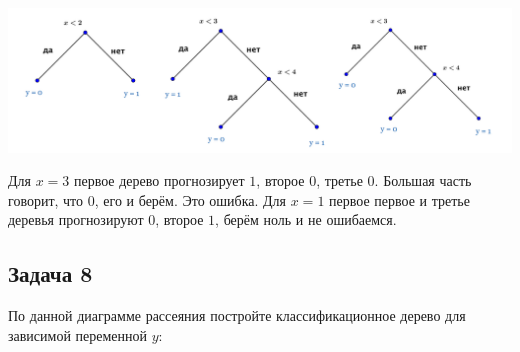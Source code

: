 \documentclass[12pt, a4paper, oneside]{article}
\theoremstyle{plain} %
\theoremstyle{definition}
\begin{document}
{\begin{enumerate}
		
		\begin{center}
			\includegraphics[scale=0.17]{forest.png}
		\end{center} 	
		
		Для $x=3$ первое дерево прогнозирует $1$, второе $0$, третье $0$. Большая часть говорит, что $0$, его и берём. Это ошибка. Для $x=1$ первое первое и третье деревья прогнозируют $0$, второе $1$, берём ноль и не ошибаемся. 
	\end{enumerate}
	
}


\subsection*{Задача 8}

По данной диаграмме рассеяния постройте классификационное дерево для зависимой переменной $y$:

\begin{center}
	\begin{tikzpicture}[scale = 0.015]
	
	\end{tikzpicture}
\end{center}
\end{document}
